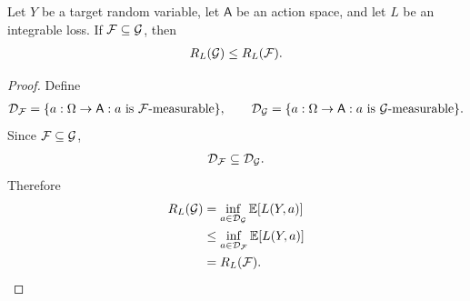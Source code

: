 \begin{theorem}
\label{thm:risk-monotonicity:formal}
Let $Y$ be a target random variable, let $\mathsf A$ be an action space, and let $L$ be an integrable loss. If $\mathcal{F}\subseteq\mathcal{G}$, then
\begin{align*}
R_L(\mathcal{G})\le R_L(\mathcal{F}).
\end{align*}
\end{theorem}
\begin{proof}
Define
\begin{align*}
\mathcal{D}_{\mathcal{F}}=\{a:\Omega\to\mathsf A:a\text{ is }\mathcal{F}\text{-measurable}\},\qquad \mathcal{D}_{\mathcal{G}}=\{a:\Omega\to\mathsf A:a\text{ is }\mathcal{G}\text{-measurable}\}.
\end{align*}
Since $\mathcal{F}\subseteq\mathcal{G}$,
\begin{align*}
\mathcal{D}_{\mathcal{F}}\subseteq\mathcal{D}_{\mathcal{G}}.
\end{align*}
Therefore
\begin{align*}
R_L(\mathcal{G})&=\inf_{a\in\mathcal{D}_{\mathcal{G}}}\operatorname*{\mathbb{E}}[L(Y,a)]\\
&\le\inf_{a\in\mathcal{D}_{\mathcal{F}}}\operatorname*{\mathbb{E}}[L(Y,a)]\\
&=R_L(\mathcal{F}).
\end{align*}
\end{proof}


